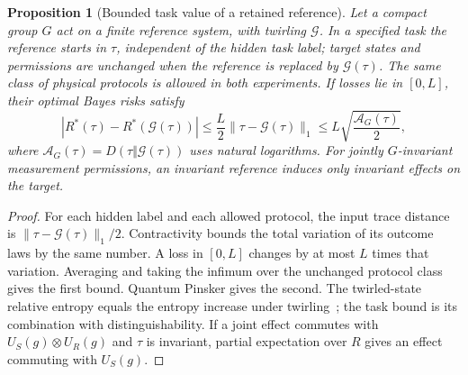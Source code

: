 \documentclass[12pt]{article}
\newtheorem{proposition}[theorem]{Proposition}
\theoremstyle{definition}
\begin{document}
\begin{proposition}[Bounded task value of a retained reference]
\label{prop:reference-value}
Let a compact group $G$ act on a finite reference system, with twirling
$\mathcal G$. In a specified task the reference starts in $\tau$, independent
of the hidden task label; target states and permissions are unchanged when
the reference is replaced by $\mathcal G(\tau)$. The same class of physical
protocols is allowed in both experiments. If losses lie in $[0,L]$, their
optimal Bayes risks satisfy
\begin{equation}\label{eq:asymmetry-risk}
 |R^*(\tau)-R^*(\mathcal G(\tau))|
 \le\frac L2\|\tau-\mathcal G(\tau)\|_1
 \le L\sqrt{\frac{\mathcal A_G(\tau)}2},
\end{equation}
where $\mathcal A_G(\tau)=D(\tau\Vert\mathcal G(\tau))$
uses natural logarithms. For jointly $G$-invariant measurement permissions,
an invariant reference induces only invariant effects on the target.
\end{proposition}
\begin{proof}
For each hidden label and each allowed protocol, the input trace distance
is $\|\tau-\mathcal G(\tau)\|_1/2$. Contractivity bounds the total variation
of its outcome laws by the same number. A loss in $[0,L]$ changes by at
most $L$ times that variation. Averaging and taking the infimum over the
unchanged protocol class gives the first bound. Quantum Pinsker gives
the second. The twirled-state relative entropy equals the entropy increase
under twirling~\cite[Proposition~2 and Theorem~3]{Gour2009}; the task bound
is its combination with distinguishability. If a joint effect commutes
with $U_S(g)\otimes U_R(g)$ and $\tau$ is invariant, partial expectation
over $R$ gives an effect commuting with $U_S(g)$.
\end{proof}
\end{document}
